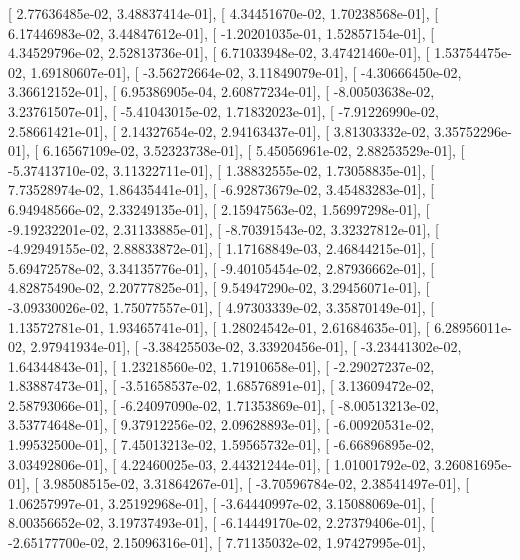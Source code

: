 \documentclass{article}
\begin{document}
       [  2.77636485e-02,   3.48837414e-01],
       [  4.34451670e-02,   1.70238568e-01],
       [  6.17446983e-02,   3.44847612e-01],
       [ -1.20201035e-01,   1.52857154e-01],
       [  4.34529796e-02,   2.52813736e-01],
       [  6.71033948e-02,   3.47421460e-01],
       [  1.53754475e-02,   1.69180607e-01],
       [ -3.56272664e-02,   3.11849079e-01],
       [ -4.30666450e-02,   3.36612152e-01],
       [  6.95386905e-04,   2.60877234e-01],
       [ -8.00503638e-02,   3.23761507e-01],
       [ -5.41043015e-02,   1.71832023e-01],
       [ -7.91226990e-02,   2.58661421e-01],
       [  2.14327654e-02,   2.94163437e-01],
       [  3.81303332e-02,   3.35752296e-01],
       [  6.16567109e-02,   3.52323738e-01],
       [  5.45056961e-02,   2.88253529e-01],
       [ -5.37413710e-02,   3.11322711e-01],
       [  1.38832555e-02,   1.73058835e-01],
       [  7.73528974e-02,   1.86435441e-01],
       [ -6.92873679e-02,   3.45483283e-01],
       [  6.94948566e-02,   2.33249135e-01],
       [  2.15947563e-02,   1.56997298e-01],
       [ -9.19232201e-02,   2.31133885e-01],
       [ -8.70391543e-02,   3.32327812e-01],
       [ -4.92949155e-02,   2.88833872e-01],
       [  1.17168849e-03,   2.46844215e-01],
       [  5.69472578e-02,   3.34135776e-01],
       [ -9.40105454e-02,   2.87936662e-01],
       [  4.82875490e-02,   2.20777825e-01],
       [  9.54947290e-02,   3.29456071e-01],
       [ -3.09330026e-02,   1.75077557e-01],
       [  4.97303339e-02,   3.35870149e-01],
       [  1.13572781e-01,   1.93465741e-01],
       [  1.28024542e-01,   2.61684635e-01],
       [  6.28956011e-02,   2.97941934e-01],
       [ -3.38425503e-02,   3.33920456e-01],
       [ -3.23441302e-02,   1.64344843e-01],
       [  1.23218560e-02,   1.71910658e-01],
       [ -2.29027237e-02,   1.83887473e-01],
       [ -3.51658537e-02,   1.68576891e-01],
       [  3.13609472e-02,   2.58793066e-01],
       [ -6.24097090e-02,   1.71353869e-01],
       [ -8.00513213e-02,   3.53774648e-01],
       [  9.37912256e-02,   2.09628893e-01],
       [ -6.00920531e-02,   1.99532500e-01],
       [  7.45013213e-02,   1.59565732e-01],
       [ -6.66896895e-02,   3.03492806e-01],
       [  4.22460025e-03,   2.44321244e-01],
       [  1.01001792e-02,   3.26081695e-01],
       [  3.98508515e-02,   3.31864267e-01],
       [ -3.70596784e-02,   2.38541497e-01],
       [  1.06257997e-01,   3.25192968e-01],
       [ -3.64440997e-02,   3.15088069e-01],
       [  8.00356652e-02,   3.19737493e-01],
       [ -6.14449170e-02,   2.27379406e-01],
       [ -2.65177700e-02,   2.15096316e-01],
       [  7.71135032e-02,   1.97427995e-01],
\end{document}
